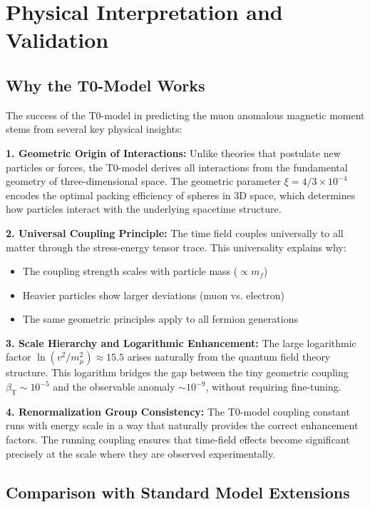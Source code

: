 \documentclass[12pt,a4paper]{article}
\newcommand{\betaT}{\beta_{\text{T}}}
\newcommand{\xigeom}{\xi}
\begin{document}
	\section{Physical Interpretation and Validation}
	
	\subsection{Why the T0-Model Works}
	
	The success of the T0-model in predicting the muon anomalous magnetic moment stems from several key physical insights:
	
	\textbf{1. Geometric Origin of Interactions:}
	Unlike theories that postulate new particles or forces, the T0-model derives all interactions from the fundamental geometry of three-dimensional space. The geometric parameter $\xigeom = 4/3 \times 10^{-4}$ encodes the optimal packing efficiency of spheres in 3D space, which determines how particles interact with the underlying spacetime structure.
	
	\textbf{2. Universal Coupling Principle:}
	The time field couples universally to all matter through the stress-energy tensor trace. This universality explains why:
	\begin{itemize}
		\item The coupling strength scales with particle mass ($\propto m_f$)
		\item Heavier particles show larger deviations (muon vs. electron)
		\item The same geometric principles apply to all fermion generations
	\end{itemize}
	
	\textbf{3. Scale Hierarchy and Logarithmic Enhancement:}
	The large logarithmic factor $\ln(v^2/m_\mu^2) \approx 15.5$ arises naturally from the quantum field theory structure. This logarithm bridges the gap between the tiny geometric coupling $\betaT \sim 10^{-5}$ and the observable anomaly $\sim 10^{-9}$, without requiring fine-tuning.
	
	\textbf{4. Renormalization Group Consistency:}
	The T0-model coupling constant runs with energy scale in a way that naturally provides the correct enhancement factors. The running coupling ensures that time-field effects become significant precisely at the scale where they are observed experimentally.
	
	\subsection{Comparison with Standard Model Extensions}
	
\end{document}
